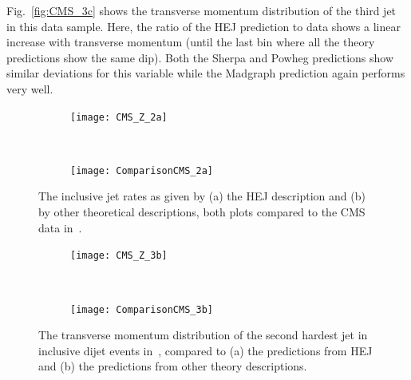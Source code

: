 	Fig.~\ref{fig:CMS_3c} shows the transverse momentum distribution of the third
	jet in this data sample.  Here, the ratio of the HEJ prediction to data shows a
	linear increase with transverse momentum (until the last bin where all the
	theory predictions show the same dip).  Both the Sherpa and Powheg predictions
	show similar deviations for this variable while the Madgraph prediction again
	performs very well.


	\begin{figure}[h]
	  \centering
	  \begin{subfigure}[b]{0.46\textwidth}
	    \texttt{[image: CMS\_Z\_2a]}
	    \caption{}
	    \label{fig:HEJ_CMS_2a}
	  \end{subfigure}
	  ~
	  \begin{subfigure}[b]{0.48\textwidth}
	    \texttt{[image: ComparisonCMS\_2a]}
	    \caption{}
	    \label{fig:MC_CMS_2a}
	  \end{subfigure}
	  \caption{The inclusive jet rates as given by (a) the HEJ description and (b)
	    by other theoretical descriptions, both plots compared to the CMS data in~\cite{Khachatryan:2014zya}.}
	  \label{fig:CMS_2a}

	  \begin{subfigure}[b]{0.46\textwidth}
	    \texttt{[image: CMS\_Z\_3b]}
	    \caption{}
	    \label{fig:HEJ_CMS_7b}
	  \end{subfigure}
	  ~
	  \begin{subfigure}[b]{0.48\textwidth}
	    \texttt{[image: ComparisonCMS\_3b]}
	    \caption{}
	    \label{fig:MC_CMS_7b}
	  \end{subfigure}
	  \caption{The transverse momentum distribution of the second hardest jet in
	    inclusive dijet events in~\cite{Khachatryan:2014zya}, compared to (a) the
	    predictions from HEJ and (b) the predictions from other theory descriptions.}
	  \label{fig:CMS_3b}
	\end{figure}

